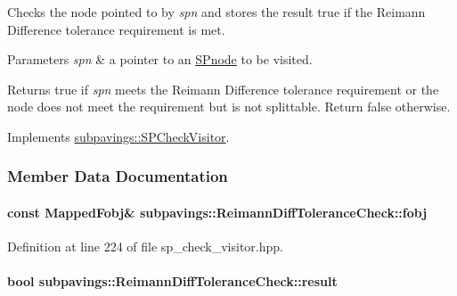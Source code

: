 \-Checks the node pointed to by {\itshape spn\/} and stores the result true if the \-Reimann \-Difference tolerance requirement is met.


\begin{DoxyParams}{\-Parameters}
{\em spn} & a pointer to an \hyperlink{classsubpavings_1_1SPnode}{\-S\-Pnode} to be visited. \\
\hline
\end{DoxyParams}
\begin{DoxyReturn}{\-Returns}
true if {\itshape spn\/} meets the \-Reimann \-Difference tolerance requirement or the node does not meet the requirement but is not splittable. \-Return false otherwise. 
\end{DoxyReturn}


\-Implements \hyperlink{classsubpavings_1_1SPCheckVisitor_ad5fd0bde6d256676290e790c6387f01a}{subpavings\-::\-S\-P\-Check\-Visitor}.



\subsubsection{\-Member \-Data \-Documentation}
\hypertarget{classsubpavings_1_1ReimannDiffToleranceCheck_ad9e4145536f0654d9982cc86931c1f27}{
\paragraph[{fobj}]{\setlength{\rightskip}{0pt plus 5cm}const {\bf \-Mapped\-Fobj}\& {\bf subpavings\-::\-Reimann\-Diff\-Tolerance\-Check\-::fobj}}}\label{classsubpavings_1_1ReimannDiffToleranceCheck_ad9e4145536f0654d9982cc86931c1f27}


\-Definition at line 224 of file sp\-\_\-check\-\_\-visitor.\-hpp.

\hypertarget{classsubpavings_1_1ReimannDiffToleranceCheck_ad750609be6399d2f013430a6651420ca}{
\paragraph[{result}]{\setlength{\rightskip}{0pt plus 5cm}bool {\bf subpavings\-::\-Reimann\-Diff\-Tolerance\-Check\-::result}}}\label{classsubpavings_1_1ReimannDiffToleranceCheck_ad750609be6399d2f013430a6651420ca}


